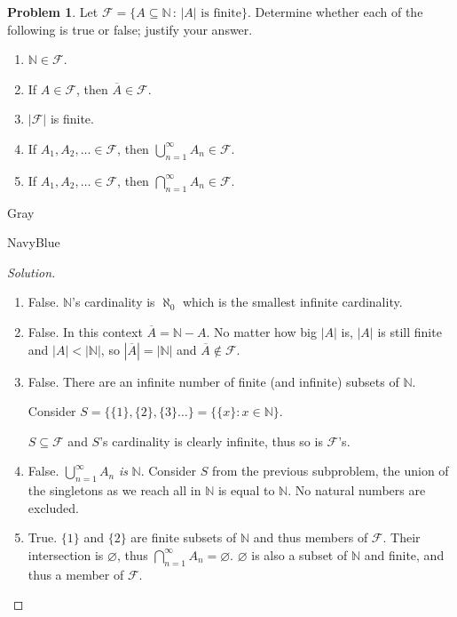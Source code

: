 \documentclass[12pt]{amsart}
\newcounter{problem_number}[section]
\theoremstyle{named}
\newenvironment{soln}
{\begin{color}{Gray}\begin{framed}\begin{color}{NavyBlue}\begin{proof}[Solution]
\doublespacing}
{\end{proof}\end{color}\end{framed}\end{color}}
\theoremstyle{definition}
\newtheorem{problem}{Problem}
\newcommand{\N}{\mathbb N}
\newcommand{\Ff}{\mathcal F}
\begin{document}
\begin{problem}
	Let $\Ff = \{A\subseteq\N\,:\,|A| \text{ is finite}\}$.
	Determine whether each of the following is true or false; justify your answer.
	\begin{enumerate}
		\item $\N\in\Ff$.
		\item If $A\in\Ff$, then $\overline A\in\Ff$.
		\item $|\Ff|$ is finite.
		\item If $A_1, A_2,\ldots \in\Ff$, then $\displaystyle\bigcup_{n=1}^\infty A_n\in\Ff$.
		\item If $A_1, A_2,\ldots \in\Ff$, then $\displaystyle\bigcap_{n=1}^\infty A_n\in\Ff$.
	\end{enumerate}
	
\end{problem}

\begin{soln}
	\phantom{ }
	\begin{enumerate}
		\item False. $\mathbb N$'s cardinality is $\aleph_0$ which is the smallest infinite cardinality.
		\item False. In this context $\overline{A} = \mathbb N - A$. No matter
		how big $|A|$ is, $|A|$ is still finite and $|A| < |\mathbb N|$, so
		$|\overline{A}| = |\mathbb N|$ and $\overline{A} \notin \mathcal F$.
		\item False. There are an infinite number of finite (and infinite)
		subsets of $\mathbb N$. 
		
		\noindent Consider $S = \{\{1\},\{2\},\{3\}\dots\} = \{\{x\}: x \in \mathbb N\}$.

		\noindent $S \subseteq \mathcal F$ and $S$'s cardinality is clearly infinite, thus so is
		$\mathcal F$'s. 

		\item False. $\displaystyle\bigcup_{n=1}^\infty A_n$ \textit{is} $\mathbb N$. Consider $S$
		from the previous subproblem, the union of the singletons as we reach all in $\mathbb N$ is
		equal to $\mathbb N$. No natural numbers are excluded.
		
		\item True. $\{1\}$ and $\{2\}$ are finite subsets of $\mathbb N$ and thus members of $\mathcal F$.
		Their intersection is $\varnothing$, thus $\displaystyle\bigcap_{n=1}^\infty A_n = \varnothing$.
		$\varnothing$ is also a subset of $\mathbb N$ and finite, and thus a member of $\mathcal F$.  
	\end{enumerate}
\end{soln}
\end{document}
